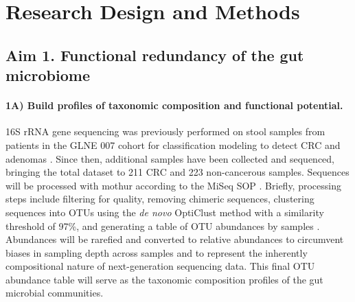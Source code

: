 \documentclass[11pt]{article}
\begin{document}
\section*{Research Design and Methods}

\subsection*{Aim 1. Functional redundancy of the gut microbiome}

\paragraph{1A) Build profiles of taxonomic composition and functional potential.}

16S rRNA gene sequencing was previously performed on stool samples from patients in the GLNE 007 cohort for classification modeling to detect CRC and adenomas \cite{baxter_microbiota-based_2016}.
Since then, additional samples have been collected and sequenced, bringing the total dataset to 211 CRC and 223 non-cancerous samples.
Sequences will be processed with mothur according to the MiSeq SOP \cite{schloss_introducing_2009, kozich_development_2013}.
Briefly, processing steps include filtering for quality, removing chimeric sequences, clustering sequences into OTUs using the \textit{de novo} OptiClust method with a similarity threshold of 97\%,
and generating a table of OTU abundances by samples \cite{westcott_opticlust_2017}.
Abundances will be rarefied and converted to relative abundances to circumvent biases in sampling depth across samples and to represent the inherently compositional nature of next-generation sequencing data.
This final OTU abundance table will serve as the taxonomic composition profiles of the gut microbial communities.
\end{document}
